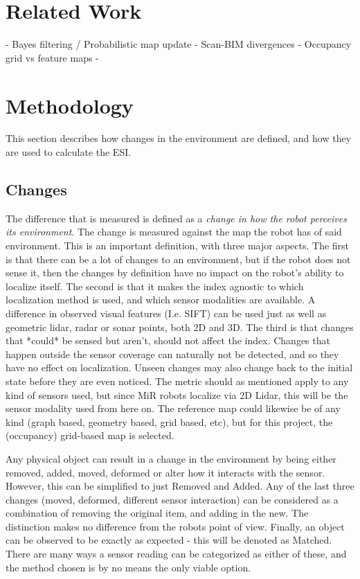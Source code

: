 \documentclass[conference]{IEEEtran}
\begin{document}
\section{Related Work}
- Bayes filtering / Probabilistic map update
- Scan-BIM divergences
- Occupancy grid vs feature maps
- 


\section{Methodology}
This section describes how changes in the environment are defined, and how they are used to calculate the ESI.
\subsection{Changes}
The difference that is measured is defined as a \textit{change in how the robot perceives its environment}. The change is measured against the map the robot has of said environment. 
This is an important definition, with three major aspects. The first is that there can be a lot of changes to an environment, but if the robot does not sense it, then the changes 
by definition have no impact on the robot's ability to localize itself. 
The second is that it makes the index agnostic to which localization method is used, and which sensor modalities are available. A difference in observed visual features (I.e. SIFT) 
can be used just as well as geometric lidar, radar or sonar points, both 2D and 3D. The third is that changes that *could* be sensed but aren't, should not affect the index. 
Changes that happen outside the sensor coverage can naturally not be detected, and so they have no effect on localization. Unseen changes may also change back to the initial state 
before they are even noticed. The metric should as mentioned apply to any kind of sensors used, but since MiR robots localize via 2D Lidar, this will be the sensor modality used 
from here on. The reference map could likewise be of any kind (graph based, geometry based, grid based, etc), but for this project, the (occupancy) grid-based map is selected. 

Any physical object can result in a change in the environment by being either removed, added, moved, deformed or alter how it interacts with the sensor. 
However, this can be simplified to just Removed and Added. Any of the last three changes (moved, deformed, different sensor interaction) can be considered as a combination 
of removing the original item, and adding in the new. The distinction makes no difference from the robots point of view. Finally, an object can be observed to be 
exactly as expected - this will be denoted as Matched. There are many ways a sensor reading can be categorized as either of these, and the method chosen is by no means 
the only viable option. 
\end{document}
